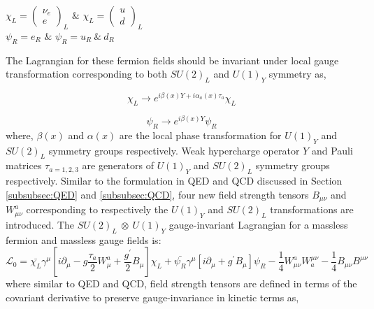 \begin{center}
$ \chi_{L} = \begin{pmatrix} \nu_{e} \\ e\end{pmatrix}_{L}$ \hspace{5pt} $\&$ \hspace{5pt} $ \chi_{L} = \begin{pmatrix}  u \\ d \end{pmatrix}_{L}$ \\
\vspace{10pt}
$ \psi_{R} = e_{R}$ \hspace{10pt} $\&$ \hspace{5pt} $\psi_{R} = u_{R} ~\&~ d_{R}$
\end{center}
The Lagrangian for these fermion fields should be invariant under local gauge transformation corresponding to both $SU(2)_{L}$ and $U(1)_{Y}$ symmetry as, 

\begin{equation}
\chi_{L} \rightarrow e^{i\beta(x)Y+i\alpha_{a}(x)\tau_{a}} \chi_{L}
\label{eqn:SU2LHTransform}
\end{equation}

\begin{equation}
\psi_{R} \rightarrow e^{i\beta(x)Y} \psi_{R}
\label{eqn:SU2RHTransform}
\end{equation}
where, $\beta(x)$ and $\alpha(x)$ are the local phase transformation for $U(1)_{Y}$ and $SU(2)_{L}$ symmetry groups respectively. Weak hypercharge operator $Y$ and Pauli matrices $\tau_{a=1,2,3}$ are generators of $U(1)_{Y}$ and $SU(2)_{L}$ symmetry groups respectively. Similar to the formulation in QED and QCD discussed in Section \ref{subsubsec:QED} and \ref{subsubsec:QCD}, four new field strength tensors $B_{\mu\nu}$ and $W^{a}_{\mu\nu}$ corresponding to respectively the $U(1)_{Y}$ and $SU(2)_{L}$ transformations are introduced. The  $SU(2)_{L}~\otimes~U(1)_{Y}$ gauge-invariant Lagrangian for a massless fermion and massless gauge fields is:
\begin{equation}
\mathcal{L}_{0} = \bar{\chi_{L}}\gamma^{\mu} [i\partial_{\mu} - g \frac{\tau_{a}}{2} W^a_{\mu} + \frac{g^{'}}{2} B_{\mu} ] \chi_{L} + \bar{\psi_{R}} \gamma^{\mu} [ i \partial_{\mu} + g^{'} B_{\mu} ] \psi_{R} - \frac{1}{4} W_{\mu\nu}^{a} W^{\mu\nu}_{a} - \frac{1}{4} B_{\mu\nu} B^{\mu\nu}
\label{eqn:EWKLagrangian1}
\end{equation}
where similar to QED and QCD, field strength tensors are defined in terms of the covariant derivative to preserve gauge-invariance in kinetic terms as,

